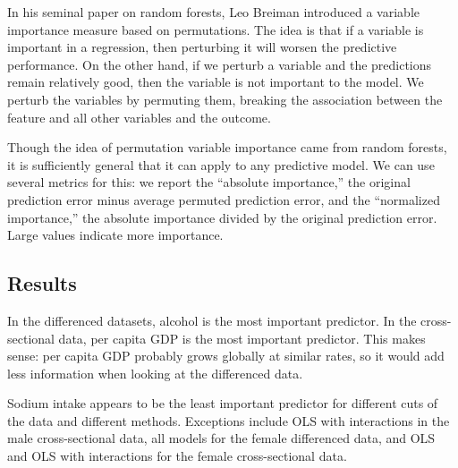 \documentclass[11pt]{article}\usepackage[]{graphicx}\usepackage[]{color}
\begin{document}
In his seminal paper on random forests, Leo Breiman introduced a variable importance measure based on permutations. 
The idea is that if a variable is important in a regression, then perturbing it will worsen the predictive performance. 
On the other hand, if we perturb a variable and the predictions remain relatively good, then the variable is not important to the model. 
We perturb the variables by permuting them, breaking the association between the feature and all other variables and the outcome.

Though the idea of permutation variable importance came from random forests, it is sufficiently general that it can apply to any predictive model. 
We can use several metrics for this: 
we report the ``absolute importance,'' the original prediction error minus average permuted prediction error, and the ``normalized importance,'' the absolute importance divided by the original prediction error. 
Large values indicate more importance.

\subsection{Results}
In the differenced datasets, alcohol is the most important predictor.
In the cross-sectional data, per capita GDP is the most important predictor.
This makes sense: per capita GDP probably grows globally at similar rates, so it would add less information when looking at the differenced data.

Sodium intake appears to be the least important predictor for different cuts of the data and different methods. 
Exceptions include OLS with interactions in the male cross-sectional data, all models for the female differenced data, and OLS and OLS with interactions for the female cross-sectional data.
\end{document}
